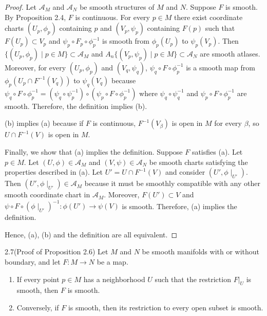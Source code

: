 \begin{proof}
  Let $\mathcal{A}_M$ and $\mathcal{A}_N$ be smooth structures of $M$ and $N$.
  Suppose $F$ is smooth.
  By Proposition 2.4, $F$ is continuous.
  For every $p \in M$ there exist coordinate charts $(U_p, \phi_p)$ containing $p$ and $(V_p, \psi_p)$ containing $F(p)$ such that $F(U_p) \subset V_p$ and $\psi_p \circ F_p \circ \phi_p^{-1}$ is smooth from $\phi_p(U_p)$ to $\psi_p(V_p)$.
  Then $\{ (U_p, \phi_p) \mid p \in M \} \subset \mathcal{A}_M$ and $A_n \{ (V_p, \psi_p) \mid p \in M \} \subset \mathcal{A}_N$ are smooth atlases.
  Moreover, for every $(U_p, \phi_p)$ and $(V_q, \psi_q)$, $\psi_q \circ F \circ \phi_p^{-1}$ is a smooth map from $\phi_p(U_p \cap F^{-1}(V_q))$ to $\psi_q(V_q)$ because $\psi_q \circ F \circ \phi^{-1}_p = (\psi_q \circ \psi_p^{-1}) \circ (\psi_p \circ F \circ \phi_p^{-1})$ where $\psi_q \circ \psi_q^{-1}$ and $\psi_p \circ F \circ \phi_p^{-1}$ are smooth.
  Therefore, the definition implies (b).

  (b) implies (a) because if $F$ is continuous, $F^{-1}(V_{\beta})$ is open in $M$ for every $\beta$, so $U \cap F^{-1}(V)$ is open in $M$.

  Finally, we show that (a) implies the definition.
  Suppose $F$ satisfies (a).
  Let $p \in M$.
  Let $(U, \phi) \in \mathcal{A}_M$ and $(V, \psi) \in \mathcal{A}_N$ be smooth charts satisfying the properties described in (a).
  Let $U' = U \cap F^{-1}(V)$ and consider $(U', \phi\mid_{U'})$.
  Then $(U', \phi\mid_{U'}) \in \mathcal{A}_M$ because it must be smoothly compatible with any other smooth coordinate chart in $\mathcal{A}_M$.
  Moreover, $F(U') \subset V$ and $\psi \circ F \circ (\phi\mid_{U'})^{-1}:\phi(U') \rightarrow \psi(V)$ is smooth.
  Therefore, (a) implies the definition.

  Hence, (a), (b) and the definition are all equivalent.
\end{proof}

\begin{customexer}{2.7(Proof of Proposition 2.6)}\label{proof_prop_2_6}
  Let $M$ and $N$ be smooth manifolds with or without boundary, and let $F: M \rightarrow N$ be a map.
  \begin{enumerate}[label=(\alph*)]
    \item 
      If every point $p \in M$ has a neighborhood $U$ such that the restriction $F\vert_U$ is smooth, then $F$ is smooth.
    \item
      Conversely, if $F$ is smooth, then its restriction to every open subset is smooth.
  \end{enumerate}
\end{customexer}

